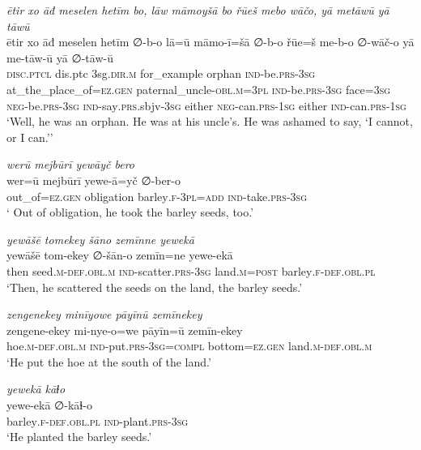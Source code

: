 \ea \label{ŽP.28}
\textit{ētir xo āđ meselen hetīm bo, lāw māmoyšā bo řūeš mebo wāčo, yā metāwū yā tāwū} \\ 
\gll ētir xo āđ meselen hetīm ∅-b-o lā=ū māmo-ī=šā ∅-b-o řūe=š me-b-o ∅-wāč-o yā me-tāw-ū yā ∅-tāw-ū \\ 
 \textsc{disc.ptcl} dis.ptc 3sg\textsc{.dir}\textsc{.m} for\_example orphan \textsc{ind-}be\textsc{.prs}\textsc{-3sg} at\_the\_place\_of\textsc{\textsc{=ez.gen}} paternal\_uncle\textsc{-obl}\textsc{.m}\textsc{=3pl} \textsc{ind-}be\textsc{.prs}\textsc{-3sg} face\textsc{=3sg} \textsc{neg-}be\textsc{.prs}\textsc{-3sg} \textsc{ind-}say\textsc{.prs}.sbjv\textsc{-3sg} either \textsc{neg-}can\textsc{.prs}\textsc{-\textsc{1sg}} either \textsc{ind-}can\textsc{.prs}\textsc{-\textsc{1sg}} \\ 
\glt `Well, he was an orphan. He was at his uncle’s. He was ashamed to say, ‘I cannot, or I can.’'
\z 
 
\ea \label{ŽP.29}
\textit{werū mejbūrī yewāyč bero} \\ 
\gll wer=ū mejbūrī yewe-ā=yč ∅-ber-o \\ 
 out\_of\textsc{\textsc{=ez.gen}} obligation barley\textsc{.f}\textsc{-3pl}\textsc{=add} \textsc{ind-}take\textsc{.prs}\textsc{-3sg} \\ 
\glt ` Out of obligation, he took the barley seeds, too.'
\z 
 
\ea \label{ŽP.32}
\textit{yewāšē tomekey šāno zemīnne yewekā} \\ 
\gll yewāšē tom-ekey ∅-šān-o zemīn=ne yewe-ekā \\ 
 then seed\textsc{.m}\textsc{-def}\textsc{.obl}\textsc{.m} \textsc{ind-}scatter\textsc{.prs}\textsc{-3sg} land\textsc{.m}\textsc{=\textsc{post}} barley\textsc{.f}\textsc{-def}\textsc{.obl}\textsc{.pl} \\ 
\glt `Then, he scattered the seeds on the land, the barley seeds.'
\z 
 
\ea \label{ŽP.34}
\textit{zengenekey minīyowe pāyīnū zemīnekey} \\ 
\gll zengene-ekey mi-nye-o=we pāyīn=ū zemīn-ekey \\ 
 hoe\textsc{.m}\textsc{-def}\textsc{.obl}\textsc{.m} \textsc{ind-}put\textsc{.prs}\textsc{-3sg}\textsc{=compl} bottom\textsc{\textsc{=ez.gen}} land\textsc{.m}\textsc{-def}\textsc{.obl}\textsc{.m} \\ 
\glt `He put the hoe at the south of the land.'
\z 
 
\ea \label{ŽP.36}
\textit{yewekā kāɫo} \\ 
\gll yewe-ekā ∅-kāɫ-o \\ 
 barley\textsc{.f}\textsc{-def}\textsc{.obl}\textsc{.pl} \textsc{ind-}plant\textsc{.prs}\textsc{-3sg} \\ 
\glt `He planted the barley seeds.'
\z 
 
